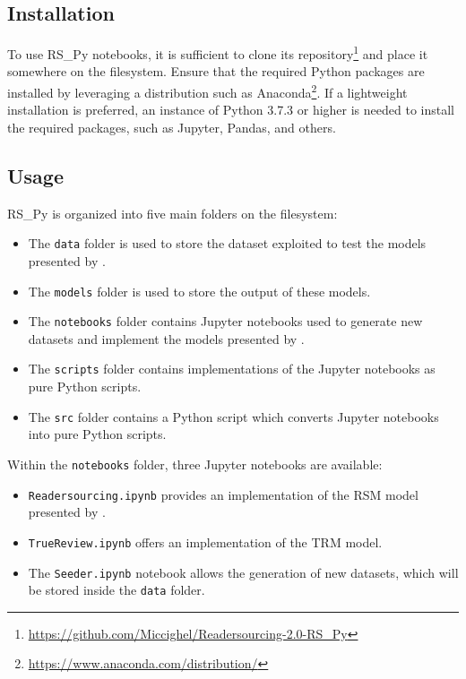 \documentclass[a4paper, english]{article}
\newcommand{\rspy}{RS\_Py\xspace}
\begin{document}
\subsection{Installation}

To use \rspy notebooks, it is sufficient to clone its repository\footnote{\url{https://github.com/Miccighel/Readersourcing-2.0-RS_Py}} and place it somewhere on the filesystem. Ensure that the required Python packages are installed by leveraging a distribution such as Anaconda\footnote{\url{https://www.anaconda.com/distribution/}}. If a lightweight installation is preferred, an instance of Python 3.7.3 or higher is needed to install the required packages, such as Jupyter, Pandas, and others.

\subsection{Usage}

\rspy is organized into five main folders on the filesystem:

\begin{itemize}
    \item The \verb|data| folder is used to store the dataset exploited to test the models presented by \citet{Soprano2019}.
    \item The \verb|models| folder is used to store the output of these models.
    \item The \verb|notebooks| folder contains Jupyter notebooks used to generate new datasets and implement the models presented by \citet{Soprano2019}.
    \item The \verb|scripts| folder contains implementations of the Jupyter notebooks as pure Python scripts.
    \item The \verb|src| folder contains a Python script which converts Jupyter notebooks into pure Python scripts.
\end{itemize}

Within the \verb|notebooks| folder, three Jupyter notebooks are available:

\begin{itemize}
    \item \verb|Readersourcing.ipynb| provides an implementation of the RSM model presented by \citet{Soprano2019}.
    \item \verb|TrueReview.ipynb| offers an implementation of the TRM model.
    \item The \verb|Seeder.ipynb| notebook allows the generation of new datasets, which will be stored inside the \verb|data| folder.
\end{itemize}
\end{document}

